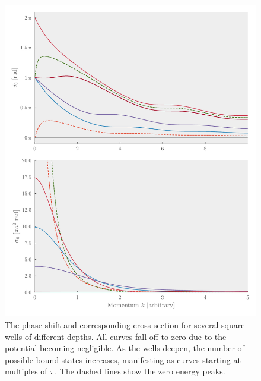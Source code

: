 \begin{figure}[hp]
  \centering
  \includegraphics[]{Figures/square_well_wave.pdf}
  \caption{\label{fig:squarewellwave}The phase shift and corresponding cross
    section for several square wells of different depths. All curves fall off to
    zero due to the potential becoming negligible. As the wells deepen,
    the number of possible bound states increases, manifesting as curves
    starting at multiples of \(\pi\). The dashed lines show the zero energy peaks.}
\end{figure}

